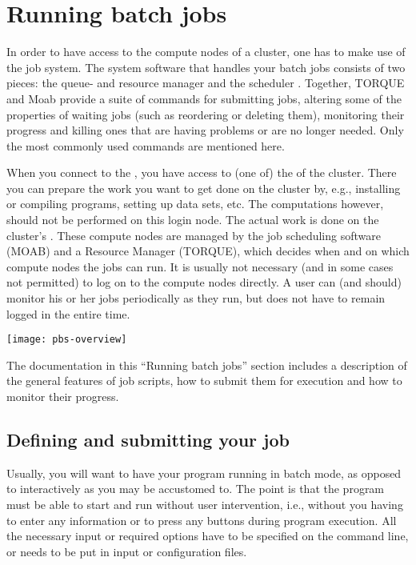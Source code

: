 \chapter{Running batch jobs}

In order to have access to the compute nodes of a cluster, one has to make use
of the job system. The system software that handles your batch jobs consists of
two pieces: the queue- and resource manager  and the scheduler
. Together, TORQUE and Moab provide a suite of commands for
submitting jobs, altering some of the properties of waiting jobs (such as
reordering or deleting them), monitoring their progress and killing ones that
are having problems or are no longer needed. Only the most commonly used
commands are mentioned here.

When you connect to the \hpc, you have access to (one of) the  of the cluster. There you can prepare the work you want to get done on
the cluster by, e.g., installing or compiling programs, setting up data sets,
etc. The computations however, should not be performed on this login node. The
actual work is done on the cluster's . These compute
nodes are managed by the job scheduling software (MOAB) and a Resource Manager
(TORQUE), which decides when and on which compute nodes the jobs can run. It is
usually not necessary (and in some cases not permitted) to log on to the
compute nodes directly. A user can (and should) monitor his or her jobs
periodically as they run, but does not have to remain logged in the entire
time.

\texttt{[image: pbs-overview]}

The documentation in this ``Running batch jobs'' section includes a description
of the general features of job scripts, how to submit them for execution and
how to monitor their progress.

\section{Defining and submitting your job}

Usually, you will want to have your program running in batch mode, as opposed
to interactively as you may be accustomed to. The point is that the program
must be able to start and run without user intervention, i.e., without you
having to enter any information or to press any buttons during program
execution. All the necessary input or required options have to be specified on
the command line, or needs to be put in input or configuration files.

